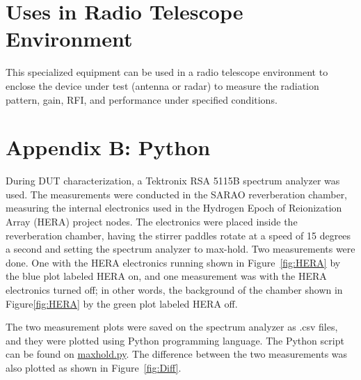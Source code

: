 \documentclass[12pt,a4paper]{report}
\begin{document}
{		\section*{Uses in Radio Telescope Environment}
		
		This specialized equipment can be used in a radio telescope environment to enclose the device under test (antenna or radar) to measure the radiation pattern, gain, RFI, and performance under specified conditions.
		
		{\section{Appendix B: Python}
			
			During DUT characterization, a Tektronix RSA 5115B spectrum analyzer was used. The measurements were conducted in the SARAO reverberation chamber, measuring the internal electronics used in the Hydrogen Epoch of Reionization Array (HERA) project nodes. The electronics were placed inside the reverberation chamber, having the stirrer paddles rotate at a speed of 15 degrees a second and setting the spectrum analyzer to max-hold. Two measurements were done. One with the HERA electronics running shown in Figure~\ref*{fig:HERA} by the blue plot labeled HERA on, and one measurement was with the HERA electronics turned off; in other words, the background of the chamber shown in Figure\ref*{fig:HERA} by the green plot labeled HERA off. 
			
			The two measurement plots were saved on the spectrum analyzer as .csv files, and they were plotted using Python programming language. The Python script can be found on \href{https://github.com/Casablanca25273/Worksheet}{maxhold.py}. The difference between the two measurements was also plotted as shown in Figure~\ref*{fig:Diff}.\\
			
}}
\end{document}
